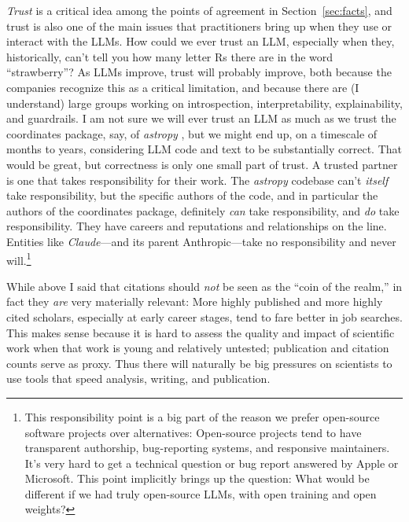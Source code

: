 \documentclass{article}
\newcommand{\sectionname}{Section}
\newcommand{\secref}[1]{\sectionname~\ref{#1}}
\begin{document}
\emph{Trust} is a critical idea among the points of agreement in \secref{sec:facts},
and trust is also one of the main issues that practitioners bring up when they use or interact with the LLMs.
How could we ever trust an LLM, especially when they, historically, can't tell you how many letter Rs there are in the word ``strawberry''?
As LLMs improve, trust will probably improve, both because the companies recognize this as a critical limitation, and because there are (I understand) large groups working on introspection, interpretability, explainability, and guardrails.
I am not sure we will ever trust an LLM as much as we trust the coordinates package, say, of \textsl{astropy} \cite{astropy},
but we might end up, on a timescale of months to years, considering LLM code and text to be substantially correct.
That would be great, but correctness is only one small part of trust.
A trusted partner is one that takes responsibility for their work.
The \textsl{astropy} codebase can't \emph{itself} take responsibility, but the specific authors of the code, and in particular the authors of the coordinates package, definitely \emph{can} take responsibility, and \emph{do} take responsibility.
They have careers and reputations and relationships on the line.
Entities like \textsl{Claude}---and its parent Anthropic---take no responsibility and never will.\footnote{%
This responsibility point is a big part of the reason we prefer open-source software projects over alternatives:
Open-source projects tend to have transparent authorship, bug-reporting systems, and responsive maintainers.
It's very hard to get a technical question or bug report answered by Apple or Microsoft.
This point implicitly brings up the question: What would be different if we had truly open-source LLMs, with open training and open weights?}

While above I said that citations should \emph{not} be seen as the ``coin of the realm,'' in fact they \emph{are} very materially relevant:
More highly published and more highly cited scholars, especially at early career stages, tend to fare better in job searches.
This makes sense because it is hard to assess the quality and impact of scientific work when that work is young and relatively untested; publication and citation counts serve as proxy.
Thus there will naturally be big pressures on scientists to use tools that speed analysis, writing, and publication.
\end{document}
